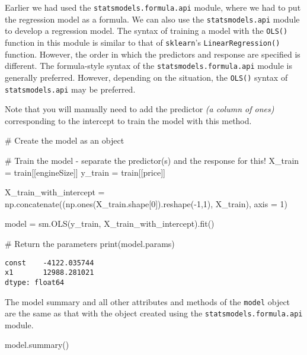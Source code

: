 \documentclass[
  letterpaper,
  DIV=11,
  numbers=noendperiod]{scrreprt}
\newenvironment{Shaded}{\begin{snugshade}}{\end{snugshade}}
\newcommand{\BuiltInTok}[1]{\textcolor[rgb]{0.00,0.23,0.31}{#1}}
\newcommand{\CommentTok}[1]{\textcolor[rgb]{0.37,0.37,0.37}{#1}}
\newcommand{\DecValTok}[1]{\textcolor[rgb]{0.68,0.00,0.00}{#1}}
\newcommand{\NormalTok}[1]{\textcolor[rgb]{0.00,0.23,0.31}{#1}}
\newcommand{\OperatorTok}[1]{\textcolor[rgb]{0.37,0.37,0.37}{#1}}
\newcommand{\StringTok}[1]{\textcolor[rgb]{0.13,0.47,0.30}{#1}}
\begin{document}
Earlier we had used the \texttt{statsmodels.formula.api} module, where
we had to put the regression model as a formula. We can also use the
\texttt{statsmodels.api} module to develop a regression model. The
syntax of training a model with the \texttt{OLS()} function in this
module is similar to that of \texttt{sklearn}'s
\texttt{LinearRegression()} function. However, the order in which the
predictors and response are specified is different. The formula-style
syntax of the \texttt{statsmodels.formula.api} module is generally
preferred. However, depending on the situation, the \texttt{OLS()}
syntax of \texttt{statsmodels.api} may be preferred.

Note that you will manually need to add the predictor \emph{(a column of
ones)} corresponding to the intercept to train the model with this
method.

\begin{Shaded}
\begin{Highlighting}[]
\CommentTok{\# Create the model as an object}

\CommentTok{\# Train the model {-} separate the predictor(s) and the response for this!}
\NormalTok{X\_train }\OperatorTok{=}\NormalTok{ train[[}\StringTok{\textquotesingle{}engineSize\textquotesingle{}}\NormalTok{]]}
\NormalTok{y\_train }\OperatorTok{=}\NormalTok{ train[[}\StringTok{\textquotesingle{}price\textquotesingle{}}\NormalTok{]]}

\NormalTok{X\_train\_with\_intercept }\OperatorTok{=}\NormalTok{ np.concatenate((np.ones(X\_train.shape[}\DecValTok{0}\NormalTok{]).reshape(}\OperatorTok{{-}}\DecValTok{1}\NormalTok{,}\DecValTok{1}\NormalTok{), X\_train), axis }\OperatorTok{=} \DecValTok{1}\NormalTok{)}

\NormalTok{model }\OperatorTok{=}\NormalTok{ sm.OLS(y\_train, X\_train\_with\_intercept).fit()}
    
\CommentTok{\# Return the parameters}
\BuiltInTok{print}\NormalTok{(model.params) }
\end{Highlighting}
\end{Shaded}

\begin{verbatim}
const    -4122.035744
x1       12988.281021
dtype: float64
\end{verbatim}

The model summary and all other attributes and methods of the
\texttt{model} object are the same as that with the object created using
the \texttt{statsmodels.formula.api} module.

\begin{Shaded}
\begin{Highlighting}[]
\NormalTok{model.summary()}
\end{Highlighting}
\end{Shaded}
\end{document}
